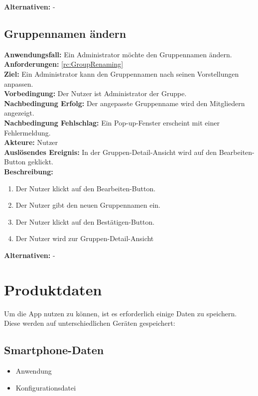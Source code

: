 \documentclass[parskip=full]{scrartcl}
\newcommand{\changelocaltocdepth}[1]{%
  \addtocontents{toc}{\protect\setcounter{tocdepth}{#1}}%
  \setcounter{tocdepth}{#1}%
}
\newcommand{\enablesubsectionnumbering}[1]{
    \renewcommand{\thesubsection}{$\langle$#1\arabic{subsection}0$\rangle$}
    \changelocaltocdepth{1} 
}
\newcommand{\resetsubsectionnumbering}{
    \renewcommand{\thesubsection}{\arabic{section}.\arabic{subsection}}
    \changelocaltocdepth{3} 
}
\begin{document}
\textbf{Alternativen:} -
\newpage


\subsection{Gruppennamen ändern}
\textbf{Anwendungsfall:} Ein Administrator möchte den Gruppennamen ändern.\\
\textbf{Anforderungen:} \ref{rc:GroupRenaming}\\
\textbf{Ziel:} Ein Administrator kann den Gruppennamen nach seinen Vorstellungen anpassen.\\
\textbf{Vorbedingung:} Der Nutzer ist Administrator der Gruppe.\\
\textbf{Nachbedingung Erfolg:} Der angepasste Gruppenname wird den Mitgliedern angezeigt.\\
\textbf{Nachbedingung Fehlschlag:} Ein Pop-up-Fenster erscheint mit einer Fehlermeldung.\\
\textbf{Akteure:} Nutzer\\
\textbf{Auslösendes Ereignis:} In der Gruppen-Detail-Ansicht wird auf den Bearbeiten-Button geklickt.\\
\textbf{Beschreibung:}
\begin{enumerate}
    \item Der Nutzer klickt auf den Bearbeiten-Button.
    \item Der Nutzer gibt den neuen Gruppennamen ein.
    \item Der Nutzer klickt auf den Bestätigen-Button.
    \item Der Nutzer wird zur Gruppen-Detail-Ansicht
\end{enumerate}
\textbf{Alternativen:} -
\newpage


\resetsubsectionnumbering


\section{Produktdaten}
\enablesubsectionnumbering{D}
Um die App nutzen zu können, ist es erforderlich einige Daten zu speichern. Diese werden auf unterschiedlichen Geräten gespeichert:

\subsection{Smartphone-Daten}
\begin{itemize}
    \item Anwendung
    \item Konfigurationsdatei
\end{itemize}
\end{document}
